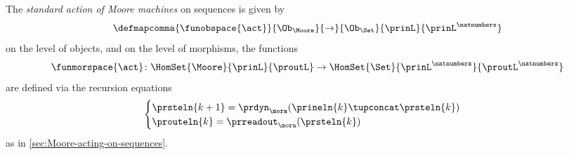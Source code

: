 \begin{definition}
    \label{def:moore-standard-action-on-sequences}
    The \emph{standard action of Moore machines} on sequences is given by
    \begin{equation*}
        \defmapcomma{\funobspace{\act}}
        {\Ob_{\Moore}}
        {\to}
        {\Ob_{\Set}}
        {\prinL}
        {\prinL^\natnumbers}
    \end{equation*}
    on the level of objects, and on the level of morphisms, the functions
    \begin{equation*}
        \funmorspace{\act} \colon  \HomSet{\Moore}{\prinL}{\proutL} \to \HomSet{\Set}{\prinL^\natnumbers}{\proutL^\natnumbers}
    \end{equation*}
    are defined via the recursion equations
    \begin{equation*}
        \begin{cases}
            \prsteln{k+1} = \prdyn_\mora(\prineln{k} \tupconcat \prsteln{k}) \\
            \prouteln{k}   = \prreadout_\mora(\prsteln{k})
        \end{cases}
    \end{equation*}
    as in \cref{sec:Moore-acting-on-sequences}.
\end{definition}

